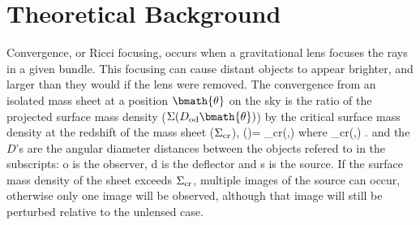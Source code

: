 \documentclass[useAMS,usenatbib]{mn2e}
\begin{document}

\section{Theoretical Background}
\label{sec:theory}

Convergence, or Ricci focusing, occurs when a gravitational lens focuses
the rays in a given bundle. This focusing can cause distant objects to
appear brighter, and larger than they would if the lens were removed.
The convergence from an isolated mass sheet at a position
$\bmath{\theta}$ on the sky is the ratio of the projected surface
mass density ($\Sigma(D_{\mathrm{od}}\bmath{\theta})$) \devided by the
critical surface mass density at the redshift of the mass sheet
($\Sigma_{\rm cr}$),
\be
\kappa(\bmath{\theta})= 
                              {\Sigma_{\rm cr}(\zd,\zs)}
\ee
where 
\be 
\label{eq:sigcrit} 
\Sigma_{\rm cr}(\zd,\zs) \equiv {}.
\ee
and the $D$'s are the angular diameter distances between the objects
refered to in the subscripts: o is the observer, d is the deflector and
s is the source. If the surface mass density of the sheet exceeds
$\Sigma_{\rm cr}$, multiple images of the source can occur, otherwise
only one image will be observed, although that image will still be
perturbed relative to the unlensed case.

\end{document}
